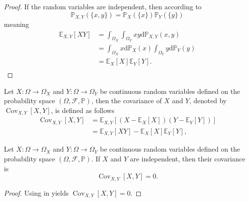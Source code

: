 \begin{proof}
	If the random variables are independent, then according to 
	\begin{equation}
		\mathbb{P}_{X,Y}(\{x,y\})=\mathbb{P}_{X}(\{x\})\mathbb{P}_{Y}(\{y\})
	\end{equation}
	meaning
	\begin{equation}
		\begin{split}
			\mathbb{E}_{X,Y}[XY] &= \int_{\Omega_X}\int_{\Omega_Y}xy\mathrm{d}\mathbb{P}_{X,Y}(x,y)\\
			&= \int_{\Omega_X}x\mathrm{d}\mathbb{P}_X(x)\int_{\Omega_Y}y\mathrm{d}\mathbb{P}_Y(y)\\
			&= \mathbb{E}_X[X]\mathbb{E}_Y[Y].\\
		\end{split}
	\end{equation}
\end{proof}

\begin{definition}[Covariance]
	\label{def:covariance}
	Let $X\colon \Omega \to \Omega_X$ and $Y\colon \Omega \to \Omega_Y$ be continuous random variables defined on the probability space $(\Omega, \mathcal{F}, \mathbb{P})$, then the covariance of $X$ and $Y$, denoted by $\operatorname{Cov}_{X,Y}[X,Y]$, is defined as follows
	\begin{equation}
		\begin{split}
			\operatorname{Cov}_{X,Y}[X,Y]&=\mathbb{E}_{X,Y}[(X-\mathbb{E}_X[X])(Y-\mathbb{E}_Y[Y])]\\
			&=\mathbb{E}_{X,Y}[XY]-\mathbb{E}_X[X]\mathbb{E}_Y[Y],
		\end{split}
	\end{equation}
\end{definition}
\begin{theorem}
	\label{theorem:covariance_of_independent_variables}
	Let $X\colon \Omega \to \Omega_X$ and $Y\colon \Omega \to \Omega_Y$ be continuous random variables defined on the probability space $(\Omega, \mathcal{F}, \mathbb{P})$. If $X$ and $Y$ are independent, then their covariance is
	\begin{equation}
		\operatorname{Cov}_{X,Y}[X,Y] = 0.
	\end{equation}
\end{theorem}
\begin{proof}
	Using  in  yields $\operatorname{Cov}_{X,Y}[X,Y]=0$.
\end{proof}

